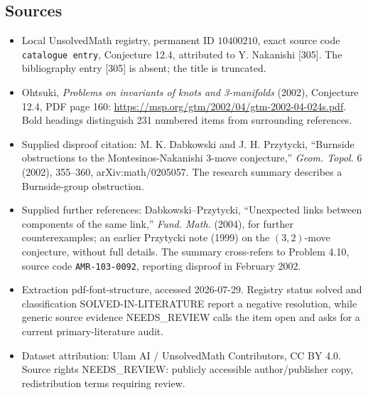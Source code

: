 \documentclass[11pt]{article}
\begin{document}
\subsection{Sources}
\begin{itemize}
\item Local UnsolvedMath registry, permanent ID \(10400210\), exact source code \texttt{catalogue entry}, Conjecture 12.4, attributed to Y. Nakanishi [305]. The bibliography entry [305] is absent; the title is truncated.
\item Ohtsuki, \emph{Problems on invariants of knots and 3-manifolds} (2002), Conjecture 12.4, PDF page 160: \url{https://msp.org/gtm/2002/04/gtm-2002-04-024s.pdf}. Bold headings distinguish 231 numbered items from surrounding references.
\item Supplied disproof citation: M. K. Dabkowski and J. H. Przytycki, ``Burnside obstructions to the Montesinos-Nakanishi 3-move conjecture,'' \emph{Geom. Topol.} 6 (2002), 355--360, arXiv:math/0205057. The research summary describes a Burnside-group obstruction.
\item Supplied further references: Dabkowski--Przytycki, ``Unexpected links between components of the same link,'' \emph{Fund. Math.} (2004), for further counterexamples; an earlier Przytycki note (1999) on the \((3,2)\)-move conjecture, without full details. The summary cross-refers to Problem 4.10, source code \texttt{AMR-103-0092}, reporting disproof in February 2002.
\item Extraction pdf-font-structure, accessed 2026-07-29. Registry status solved and classification SOLVED-IN-LITERATURE report a negative resolution, while generic source evidence NEEDS\_REVIEW calls the item open and asks for a current primary-literature audit.
\item Dataset attribution: Ulam AI / UnsolvedMath Contributors, CC BY 4.0. Source rights NEEDS\_REVIEW: publicly accessible author/publisher copy, redistribution terms requiring review.
\end{itemize}
\end{document}
